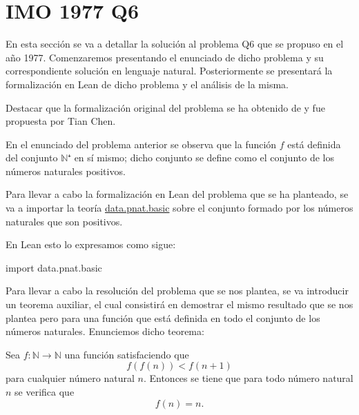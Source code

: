 \section{IMO 1977 Q6}

En esta sección se va a detallar la solución al problema Q6 que se
propuso en el año 1977. Comenzaremos presentando el enunciado de dicho
problema y su correspondiente solución en lenguaje
natural. Posteriormente se presentará la formalización en Lean de dicho
problema y el análisis de la misma.

Destacar que la formalización original del problema se ha obtenido de
\cite{TC} y fue propuesta por Tian Chen.

\noindent
{}

\begin{nota}
  En el enunciado del problema anterior se observa que la función \(f\) está
  definida del conjunto \(ℕ⁺\) en sí mismo; dicho conjunto se define como
  el conjunto de los números naturales positivos.
\end{nota}

Para llevar a cabo la formalización en Lean del problema que
se ha planteado, se va a importar la teoría
\href{https://github.com/leanprover-community/mathlib/blob/
  master/src/data/pnat/basic.lean}{data.pnat.basic} sobre el conjunto
formado por los números naturales que son positivos.

En Lean esto lo expresamos como sigue:
\begin{leancode}
import data.pnat.basic
\end{leancode}

Para llevar a cabo la resolución del problema que se nos plantea,
se va introducir un teorema auxiliar, el cual consistirá en
demostrar el mismo resultado que se nos plantea pero para una
función que está definida en todo el conjunto de los números
naturales. Enunciemos dicho teorema:

\begin{teorema}[Extension]\label{extension}
  Sea \(f:ℕ → ℕ\) una función satisfaciendo que
  \begin{equation}
    f(f(n)) < f(n+1)
  \end{equation}
  para cualquier número natural \(n\). Entonces se tiene que
  para todo número natural \(n\) se verifica que
  \begin{equation}
    f(n) = n.
  \end{equation}
\end{teorema}

